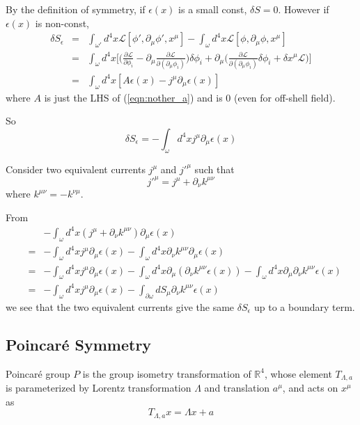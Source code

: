 \documentclass[12pt]{book}
\begin{document}
	By the definition of symmetry, if $\epsilon(x)$ is a small const, $\delta S=0$. However if $\epsilon(x)$ is non-const,
	\begin{eqnarray}
		\delta S_\epsilon&=&\int_{\omega'}d^4x\mathcal{L}[\phi',\partial_\mu\phi',x^\mu]-\int_{\omega}d^4x\mathcal{L}[\phi,\partial_\mu\phi,x^\mu]\\
		&=&\int_{\omega}d^4x\Big[\Big(\frac{\partial\mathcal{L}}{\partial\phi_i}-\partial_\mu\frac{\partial\mathcal{L}}{\partial(\partial_\mu\phi_i)}\Big)\delta\phi_i+\partial_\mu\Big(\frac{\partial\mathcal{L}}{\partial(\partial_\mu\phi_i)}\delta\phi_i+\delta x^\mu\mathcal{L}\Big)\Big]\\
		&=&\int_{\omega}d^4x[A\epsilon(x)-j^\mu\partial_\mu\epsilon(x)]
	\end{eqnarray}
	where $A$ is just the LHS of (\ref{eqn:nother_a}) and is $0$ (even for off-shell field).
	
	So
	\begin{equation}
		\delta S_\epsilon=-\int_{\omega}d^4x j^\mu\partial_\mu\epsilon(x)
	\end{equation}
	
	Consider two equivalent currents $j^\mu$ and $j'^\mu$ such that
	\begin{equation}
	j'^\mu=j^\mu+\partial_\nu k^{\mu\nu}
	\end{equation}
	where $k^{\mu\nu}=-k^{\nu\mu}$.
	
	From
	\begin{eqnarray}
		&&-\int_{\omega}d^4x (j^\mu+\partial_\nu k^{\mu\nu})\partial_\mu\epsilon(x)\\
		&=&-\int_{\omega}d^4x j^\mu\partial_\mu\epsilon(x)-\int_{\omega}d^4x \partial_\nu k^{\mu\nu}\partial_\mu\epsilon(x)\\
		&=&-\int_{\omega}d^4x j^\mu\partial_\mu\epsilon(x)-\int_{\omega}d^4x\partial_\mu( \partial_\nu k^{\mu\nu}\epsilon(x))-\int_{\omega}d^4x\partial_\mu\partial_\nu k^{\mu\nu}\epsilon(x)\\
		&=&-\int_{\omega}d^4x j^\mu\partial_\mu\epsilon(x)-\int_{\partial\omega}dS_\mu\partial_\nu k^{\mu\nu}\epsilon(x)
	\end{eqnarray}
	we see that the two equivalent currents give the same $\delta S_\epsilon$ up to a boundary term.
	\subsection{Poincar\'e Symmetry}
	
	Poincar\'e group $P$ is the group isometry transformation of $\mathbb R^4$, whose element $T_{\Lambda,a}$ is parameterized by Lorentz transformation $\Lambda$ and translation $a^\mu$, and acts on $x^\mu$ as 
	\begin{equation}
		T_{\Lambda,a}x=\Lambda x+a
	\end{equation}	
	
\end{document}
